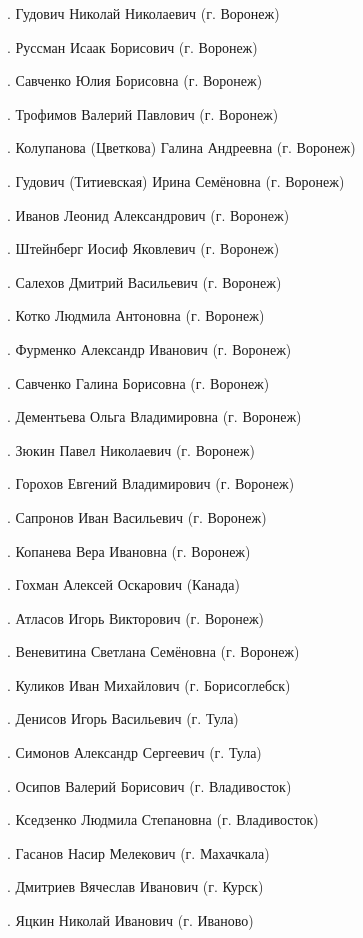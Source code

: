 .	Гудович Николай Николаевич (г. Воронеж)

.	Руссман Исаак Борисович (г. Воронеж)

.	Савченко Юлия Борисовна (г. Воронеж)

.	Трофимов Валерий Павлович (г. Воронеж)

.	Колупанова (Цветкова) Галина Андреевна (г. Воронеж)

.	Гудович (Титиевская) Ирина Семёновна (г. Воронеж)

.	Иванов Леонид Александрович (г. Воронеж)

.	Штейнберг Иосиф Яковлевич (г. Воронеж)

.	Салехов Дмитрий Васильевич (г. Воронеж)

.	Котко Людмила Антоновна (г. Воронеж)

.	Фурменко Александр Иванович (г. Воронеж)

.	Савченко Галина Борисовна (г. Воронеж)

.	Дементьева Ольга Владимировна (г. Воронеж)

.	Зюкин Павел Николаевич (г. Воронеж)

.	Горохов Евгений Владимирович (г. Воронеж)

.	Сапронов Иван Васильевич (г. Воронеж)

.	Копанева Вера Ивановна (г. Воронеж)

.	Гохман Алексей Оскарович (Канада)

.	Атласов Игорь Викторович (г. Воронеж)

.	Веневитина Светлана Семёновна (г. Воронеж)

.	Куликов Иван Михайлович (г. Борисоглебск)

.	Денисов Игорь Васильевич (г. Тула)

.	Симонов Александр Сергеевич (г. Тула)

.	Осипов Валерий Борисович (г. Владивосток)

.	Кседзенко Людмила Степановна (г. Владивосток)

.	Гасанов Насир Мелекович (г. Махачкала)

.	Дмитриев Вячеслав Иванович (г. Курск)

.	Яцкин Николай Иванович (г. Иваново)

